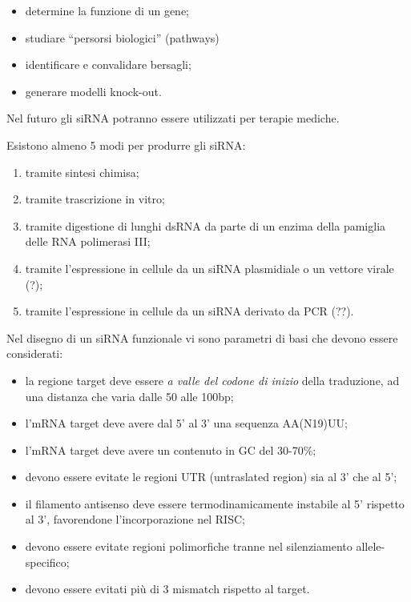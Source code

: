 \documentclass[]{article}
\begin{document}
\begin{itemize}
\itemsep1pt\parskip0pt
\item
  determine la funzione di un gene;
\item
  studiare ``persorsi biologici'' (pathways)
\item
  identificare e convalidare bersagli;
\item
  generare modelli knock-out.
\end{itemize}

Nel futuro gli siRNA potranno essere utilizzati per terapie mediche.

Esistono almeno 5 modi per produrre gli siRNA:

\begin{enumerate}
\def\labelenumi{\arabic{enumi}.}
\itemsep1pt\parskip0pt
\item
  tramite sintesi chimisa;
\item
  tramite trascrizione in vitro;
\item
  tramite digestione di lunghi dsRNA da parte di un enzima della
  pamiglia delle RNA polimerasi III;
\item
  tramite l'espressione in cellule da un siRNA plasmidiale o un vettore
  virale (?);
\item
  tramite l'espressione in cellule da un siRNA derivato da PCR (??).
\end{enumerate}

Nel disegno di un siRNA funzionale vi sono parametri di basi che devono
essere considerati:

\begin{itemize}
\itemsep1pt\parskip0pt
\item
  la regione target deve essere \emph{a valle del codone di inizio}
  della traduzione, ad una distanza che varia dalle 50 alle 100bp;
\item
  l'mRNA target deve avere dal 5' al 3' una sequenza AA(N19)UU;
\item
  l'mRNA target deve avere un contenuto in GC del 30-70\%;
\item
  devono essere evitate le regioni UTR (untraslated region) sia al 3'
  che al 5';
\item
  il filamento antisenso deve essere termodinamicamente instabile al 5'
  rispetto al 3', favorendone l'incorporazione nel RISC;
\item
  devono essere evitate regioni polimorfiche tranne nel silenziamento
  allele-specifico;
\item
  devono essere evitati più di 3 mismatch rispetto al target.
\end{itemize}
\end{document}

